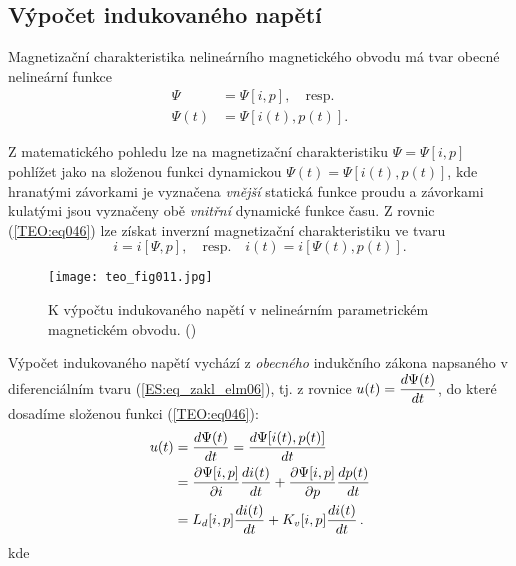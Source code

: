     \subsection{Výpočet indukovaného napětí}
      Magnetizační charakteristika nelineárního magnetického obvodu má tvar obecné nelineární funkce
      \begin{align}\label{TEO:eq046}
        \Psi    &= \Psi[i,p], \quad\text{resp.}   \nonumber \\
        \Psi(t) &= \Psi[i(t), p(t)].
      \end{align}
    
      Z matematického pohledu lze na magnetizační charakteristiku \(\Psi = \Psi[i,p]\) pohlížet 
      jako na složenou funkci dynamickou \(\Psi(t) = \Psi[i(t),p(t)]\), kde hranatými závorkami je 
      vyznačena \emph{vnější} statická funkce proudu a závorkami kulatými jsou vyznačeny obě 
      \emph{vnitřní} dynamické funkce času. Z rovnic (\ref{TEO:eq046}) lze získat inverzní 
      magnetizační charakteristiku ve tvaru
      \begin{equation}\label{TEO:eq047}
        i = i[\Psi, p], \quad\text{resp.}\quad i(t) = i[\Psi(t), p(t)].
      \end{equation}

      \begin{figure}[ht!]  %
        \centering
        \texttt{[image: teo\_fig011.jpg]}
        \caption{K výpočtu indukovaného napětí v nelineárním parametrickém magnetickém obvodu. 
                (\cite[s.~161]{Patocka4})}
        \label{teo:fig011}
      \end{figure}
      
      Výpočet indukovaného napětí vychází z \emph{obecného} indukčního zákona napsaného v 
      diferenciálním tvaru (\ref{ES:eq_zakl_elm06}), tj. z rovnice \(u(t) = \dfrac{d \Psi(t)}{d t}\), do 
      které dosadíme složenou funkci (\ref{TEO:eq046}):
      \begin{align}
        u(t) &= \dfrac{d \Psi(t)}{d t} = \dfrac{d \Psi[i(t),p(t)]}{d t}                   \nonumber \\
             &= \dfrac{\partial \Psi[i, p]}{\partial i}\dfrac{d i(t)}{d t} 
              + \dfrac{\partial \Psi[i, p]}{\partial p}\dfrac{d p(t)}{d t}                             \nonumber \\
             &= L_d[i,p]\dfrac{d i(t)}{d t} 
              + K_v[i,p]\dfrac{d i(t)}{d t}\,.                                      \label{TEO:eq048}
      \end{align}
      kde 
           
